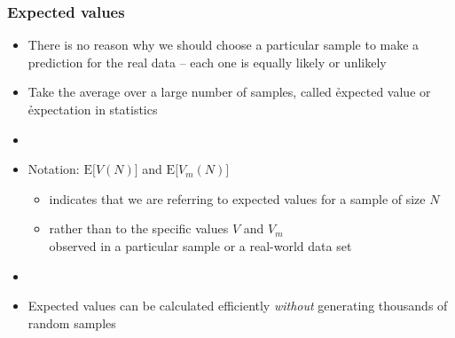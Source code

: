 \documentclass[handout,notes=show,t]{beamer} %
\begin{document}
\begin{frame}
  \frametitle{Expected values}

  \begin{itemize}
  \item There is no reason why we should choose a particular sample to make a
    prediction for the real data -- each one is equally likely or unlikely
  \item Take the average over a large number of samples, called \h{expected
      value} or \h{expectation} in statistics
  \item[]
  \item Notation: $\text{E}\bigl[V(N)\bigr]$ and $\text{E}\bigl[V_m(N)\bigr]$
    \begin{itemize}
    \item indicates that we are referring to expected values for a sample of
      size $N$
    \item rather than to the specific values $V$ and $V_m$\\
      observed in a particular sample or a real-world data set
    \end{itemize}
  \item[]
  \item Expected values can be calculated efficiently \emph{without}
    generating thousands of random samples
  \end{itemize}
\end{frame}
\end{document}

